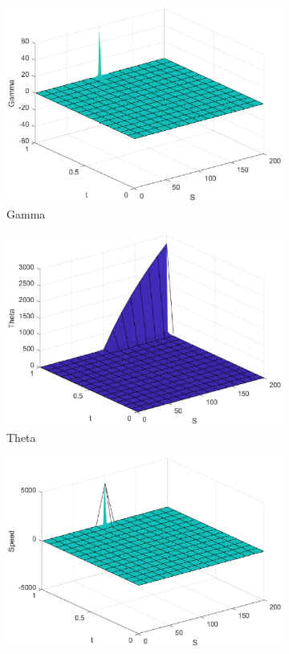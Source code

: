 \begin{figure}[H]
\begin{subfigure}[b]{0.35\linewidth}
        \includegraphics[width=\linewidth]{Imagenes/Parte1/6_Sols/Binary_Call/Binary_Call_Gamma.eps}
        \caption{Gamma}
    \end{subfigure}
    \begin{subfigure}[b]{0.35\linewidth}
        \includegraphics[width=\linewidth]{Imagenes/Parte1/6_Sols/Binary_Call/Binary_Call_Theta.eps}
        \caption{Theta}
    \end{subfigure}
    \begin{subfigure}[b]{0.35\linewidth}
        \includegraphics[width=\linewidth]{Imagenes/Parte1/6_Sols/Binary_Call/Binary_Call_Speed.eps}

\end{subfigure}
\end{figure}
